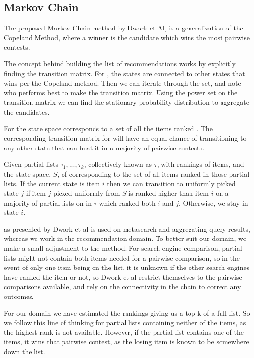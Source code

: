 \subsection{Markov Chain}\label{sec:markovchain}
The proposed Markov Chain method by Dwork et Al, \MC is a generalization of the Copeland Method, where a winner is the candidate which wins the most pairwise contests.

The concept behind building the list of recommendations works by explicitly finding the transition matrix. For \MC, the states are connected to other states that wins per the Copeland method. Then we can iterate through the set, and note who performs best to make the transition matrix. Using the power set on the transition matrix we can find the stationary probability distribution to aggregate the candidates.

For \MC the state space corresponds to a set of all the items ranked . The corresponding transition matrix for \MC will have an equal chance of transitioning to any other state that can beat it in a majority of pairwise contests.

Given partial lists $\tau_1,...,\tau_k$, collectively known as $\tau$, with rankings of items, and the state space, $S$, of \MC corresponding to the set of all items ranked in those partial lists. If the current state is item $i$ then we can transition to uniformly picked state $j$ if item $j$ picked uniformly from $S$ is ranked higher than item $i$ on a majority of partial lists on in $\tau$ which ranked both $i$ and $j$. Otherwise, we stay in state $i$.

\MC as presented by Dwork et al is used on metasearch and aggregating query results, whereas we work in the recommendation domain. To better suit our domain, we make a small adjustment to the method. For search engine comparison, partial lists might not contain both items needed for a pairwise comparison, so in the event of only one item being on the list, it is unknown if the other search engines have ranked the item or not, so Dwork et al restrict themselves to the pairwise comparisons available, and rely on the connectivity in the chain to correct any outcomes.

For our domain we have estimated the rankings giving us a top-k of a full list. So we follow this line of thinking for partial lists containing neither of the items, as the highest rank is not available. However, if the partial list contains one of the items, it wins that pairwise contest, as the losing item is known to be somewhere down the list.

